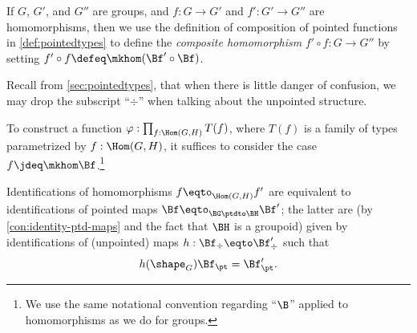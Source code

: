 \begin{definition}\label{def:group-homomorphism-composition}
  If $G$, $G'$, and $G''$ are groups, and $f : G\to G'$ and $f' : G'\to G''$ are homomorphisms, then we use
  the definition of composition of pointed functions in \cref{def:pointedtypes} to define the \emph{composite homomorphism}
  $f' \circ f : G \to G''$ by setting $f' \circ f \defeq \mkhom (\Bf' \circ \Bf)$.
\end{definition}

Recall from \cref{sec:pointedtypes},
that when there is little danger of confusion, we may drop the subscript
``$\div$'' when talking about the unpointed structure.

\begin{remark}\label{rem:Bf-convention}
  To construct a function $\varphi : \prod_{f:\Hom(G,H)}T(f)$,
  where $T(f)$ is a family of types parametrized by $f:\Hom(G,H)$,
  it suffices to consider the case $f \jdeq \mkhom\Bf$.\footnote{%
    We use the same notational convention regarding ``$\B$''
    applied to homomorphisms as we do for groups.}
\end{remark}

Identifications of homomorphisms $f\eqto_{\Hom(G,H)}f'$
are equivalent to identifications of pointed maps
$\Bf \eqto_{\BG\ptdto\BH} \Bf'$;
the latter are
(by \cref{con:identity-ptd-maps} and the fact that $\BH$ is a groupoid)
given by identifications of (unpointed) maps
$h : \Bf_\div \eqto \Bf'_\div$ such that
\[
  h(\shape_G)\Bf_\pt = \Bf'_\pt.
\]


